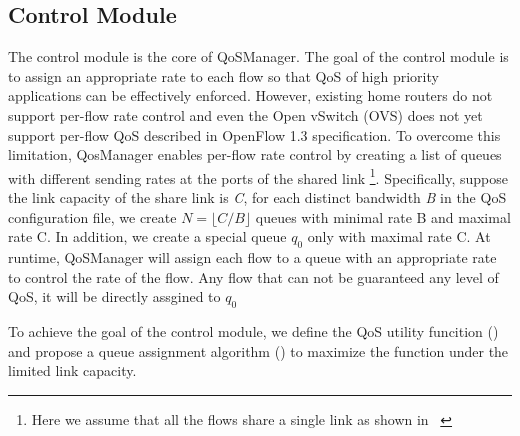 %

\subsection{Control Module}

The control module is the core of QoSManager. The goal of the control module is to assign an appropriate rate to each flow so that
QoS of high priority applications can be effectively enforced. However, existing home routers do not support per-flow rate control
and even the Open vSwitch (OVS) does not yet support per-flow QoS described in OpenFlow 1.3 specification. To overcome this limitation,
QosManager enables per-flow rate control by creating a list of queues with different sending rates at the ports of the shared link
\footnote{Here we assume that all the flows share a single link as shown in ~}. Specifically, suppose the link capacity
of the share link is \emph{C}, for each distinct bandwidth \emph{B} in the QoS configuration file, we create $ N = \lfloor C / B \rfloor $
queues with minimal rate B and maximal rate C. In addition, we create a special queue $q_0$ only with maximal rate C. At runtime,
QoSManager will assign each flow to a queue with an appropriate rate to control the rate of the flow. Any flow that can not be guaranteed
any level of QoS, it will be directly assgined to $q_0$

To achieve the goal of the control module, we define the QoS utility funcition () and propose a queue assignment
algorithm () to maximize the function under the limited link capacity.

